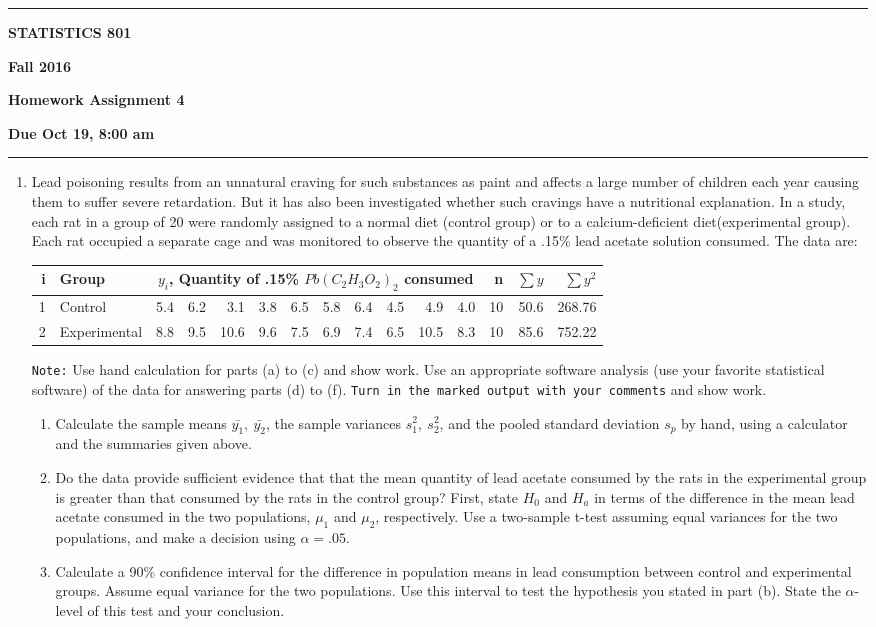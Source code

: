 \documentclass[11pt]{article}
\begin{document}
\hrule
\medskip
\centerline{\textbf{STATISTICS 801}}\hfill \textbf{Fall 2016}
\centerline{\textbf{Homework Assignment 4}}
\centerline{\textbf{Due Oct 19, 8:00 am}}
\smallskip
\hrule
\smallskip
\begin{enumerate}
\item Lead poisoning results from an unnatural craving for such substances as paint
and affects a large number of children each year causing them to suffer severe retardation. 
But it has also been investigated whether such cravings have a nutritional explanation. In a
study, each rat in a group of 20 were randomly assigned to a normal diet (control group) 
or to a calcium-deficient diet(experimental group). Each rat occupied a separate cage and was monitored to observe 
the quantity of a .15\% lead acetate solution consumed. The data are:
\begin{center}
\begin{tabular}[7]{r|l|rrrrrrrrrr|rrr} \hline
i&Group & \multicolumn{10}{|c|}{$y_i$, Quantity of .15\%	$Pb(C_2H_3O_2)_2$  consumed} &n &$\sum{y}$ & $\sum{y^2}$\\ \hline
1&Control  & 5.4 & 6.2 & 3.1 & 3.8 & 6.5 & 5.8 & 6.4 & 4.5 & 4.9 & 4.0 & 10 & 50.6 & 268.76\\
2&Experimental & 8.8 & 9.5 & 10.6 & 9.6 & 7.5 & 6.9 & 7.4 & 6.5 & 10.5 & 8.3 & 10 & 85.6 & 752.22\\ \hline
\end{tabular}
\end{center}
{\tt Note:}  Use hand calculation for parts (a) to (c) and show work. Use an appropriate 
software analysis (use your favorite statistical software) of the data for answering parts (d) to (f). 
{\tt Turn in the marked output with your comments} and show work. 
\begin{enumerate}
\item Calculate the sample means $\bar{y_1},\ \bar{y_2}$, the sample variances
$s_1^2,\ s_2^2$, and the pooled standard deviation $s_p$ by hand, using a calculator and the summaries given above.
\item Do the data provide sufficient evidence that that the mean quantity of
lead acetate consumed by the rats in the experimental group is
greater than that consumed by the rats in the control group?
First, state $H_0$ and $H_a$ in terms of the difference in the mean lead acetate consumed 
in the two populations, $\mu_1$ and $\mu_2$, respectively. Use a two-sample t-test  
assuming equal variances for the  two populations, and make a decision using $\alpha=.05$.
\item Calculate a 90\% confidence interval for the difference
in population means in lead consumption between control and 
experimental groups. Assume equal variance for the two
populations. Use this interval to test the hypothesis you stated in
part (b). State the $\alpha$-level of this test and your conclusion.


\end{enumerate}
\end{enumerate}
\end{document}
